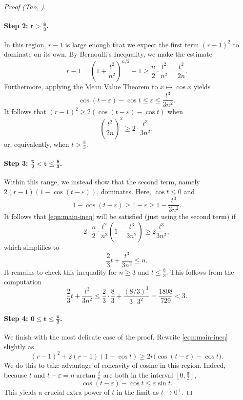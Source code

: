 \documentclass[11pt]{article}
\theoremstyle{definition}
\newcommand{\eps}{\varepsilon}
\begin{document}
\begin{proof}[Proof (Tao, \cite{tao-MO})]
	\paragraph{\textbf{Step 2: $\boldsymbol{t > \tfrac 83}$.}} In this region, $r-1$ is large enough that we expect the first term $(r-1)^2$ to dominate on its own.  By Bernoulli's Inequality, we make the estimate
	\[
	r - 1 = \left(1 + \frac{t^2}{n^2}\right)^{n/2} - 1 \geq \frac n2 \cdot \frac{t^2}{n^2} = \frac{t^2}{2n}.
	\]
	Furthermore, applying the Mean Value Theorem to $x\mapsto \cos x$ yields
	\[
	\cos(t-\eps) - \cos t \leq \eps \leq \frac{t^3}{3n^2}.
	\]
	It follows that $(r-1)^2 \geq 2(\cos(t-\eps) - \cos t)$ when
	\[
	\left(\frac{t^2}{2n}\right)^2 \geq 2\cdot \frac{t^3}{3n^2},
	\]
	or, equivalently, when $t > \frac 83$.
	
	\paragraph{\textbf{Step 3: $\boldsymbol{\tfrac \pi 2 < t \leq \tfrac 83}$.}}
	Within this range, we instead show that the second term, namely $2(r-1)(1-\cos(t-\eps))$, dominates.  Here, $\cos t\leq 0$ and
	\[
	1 - \cos(t-\eps) \geq 1 - \eps \geq 1 - \frac{t^3}{3n^2}.
	\] 
	It follows that \eqref{eqn:main-ineq} will be satisfied (just using the second term) if
	\[
	2\cdot \frac n2 \cdot \frac{t^2}{n^2}\left(1 - \frac{t^3}{3n^2}\right) \geq 2\frac{t^3}{3n^2},
	\]
	which simplifies to
	\[
	\frac 23t + \frac{t^3}{3n^2} \leq n.
	\]
	It remains to check this inequality for $n\geq 3$ and $t\leq \tfrac 83$.  This follows from the computation
	\[
	\frac 23t + \frac{t^3}{3n^2} \leq \frac 23\cdot \frac 83 + \frac{(8/3)^3}{3\cdot 3^2} = \frac{1808}{729} < 3.
	\]
	
	\paragraph{\textbf{Step 4: $\boldsymbol{0\leq t \leq \tfrac \pi 2}$.}} We finish with the most delicate case of the proof.  Rewrite \eqref{eqn:main-ineq} slightly as
	\begin{equation}\label{eqn:modified}
		(r-1)^2 + 2(r-1)(1-\cos t) \geq 2r\Big(\cos(t-\eps) - \cos t\Big).
	\end{equation}
	We do this to take advantage of concavity of cosine in this region.  Indeed, because $t$ and $t-\eps = n\arctan \tfrac tn$ are both in the interval $[0,\tfrac \pi 2]$, 
	\[
	\cos(t-\eps) - \cos t \leq \eps\sin t.
	\]
	This yields a crucial extra power of $t$ in the limit as $t\to 0^+$.
	

\end{proof}
\end{document}
